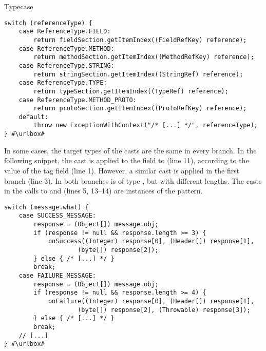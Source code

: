 \begin{pattern}{Typecase}
\def\urlvar{http://bit.ly/JesusFreke_smali_2Ho8bVL}
\begin{verbatim}
switch (referenceType) {
    case ReferenceType.FIELD:
        return fieldSection.getItemIndex((FieldRefKey) reference);
    case ReferenceType.METHOD:
        return methodSection.getItemIndex((MethodRefKey) reference);
    case ReferenceType.STRING:
        return stringSection.getItemIndex((StringRef) reference);
    case ReferenceType.TYPE:
        return typeSection.getItemIndex((TypeRef) reference);
    case ReferenceType.METHOD_PROTO:
        return protoSection.getItemIndex((ProtoRefKey) reference);
    default:
        throw new ExceptionWithContext("/* [...] */", referenceType);
} #\urlbox#
\end{verbatim}

In some cases, the target types of the casts are the same in every branch.
In the following snippet,
the cast is applied to the  field to (line 11),
according to the value of the tag  field (line 1).
However, a similar cast is applied in the first branch (line 3).
In both branches  is of type ,
but with different lengths.
The casts in the calls to  and
 (lines 5, 13--14)
are instances of the  pattern.

\def\urlvar{http://bit.ly/loopj_android_async_http_2IpIULk}
\begin{verbatim}
switch (message.what) {
    case SUCCESS_MESSAGE:
        response = (Object[]) message.obj;
        if (response != null && response.length >= 3) {
            onSuccess((Integer) response[0], (Header[]) response[1],
					(byte[]) response[2]);
        } else { /* [...] */ }
        break;
    case FAILURE_MESSAGE:
        response = (Object[]) message.obj;
        if (response != null && response.length >= 4) {
            onFailure((Integer) response[0], (Header[]) response[1],
                    (byte[]) response[2], (Throwable) response[3]);
        } else { /* [...] */ }
        break;
    // [...]
} #\urlbox#
\end{verbatim}


\end{pattern}
